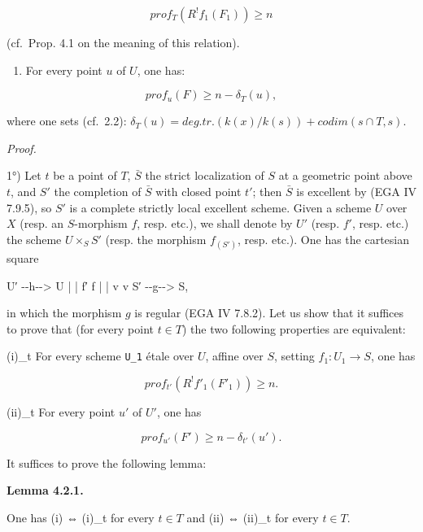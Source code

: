 \documentclass[
]{article}
\newenvironment{Shaded}{}{}
\newcommand{\NormalTok}[1]{#1}
\providecommand{\tightlist}{%
  \setlength{\itemsep}{0pt}\setlength{\parskip}{0pt}}
\begin{document}
\[
prof_{T}(R^{!} f_{1}(F_{1})) \geqslant n
\]

(cf.~Prop. 4.1 on the meaning of this relation).

\begin{enumerate}
\def\labelenumi{(\roman{enumi})}
\setcounter{enumi}{1}
\tightlist
\item
  For every point \(u\) of \(U\), one has:
\end{enumerate}

\[
prof_{u}(F) \geqslant n - \delta_{T}(u),
\]

where one sets (cf.~2.2):
\(\delta_{T}(u) = deg.tr.(k(x)/k(s)) + codim({s} \cap T, {s})\).

\emph{Proof.}

1°) Let \(t\) be a point of \(T\), \(\bar{S}\) the strict localization
of \(S\) at a geometric point above \(t\), and \(S'\) the completion of
\(\bar{S}\) with closed point \(t'\); then \(\bar{S}\) is excellent by
(EGA IV 7.9.5), so \(S'\) is a complete strictly local excellent scheme.
Given a scheme \(U\) over \(X\) (resp. an \(S\)-morphism \(f\), resp.
etc.), we shall denote by \(U'\) (resp. \(f'\), resp. etc.) the scheme
\(U \times_{S} S'\) (resp. the morphism \(f_{(S')}\), resp. etc.). One
has the cartesian square

\begin{Shaded}
\begin{Highlighting}[]
\NormalTok{U′ {-}{-}h{-}{-}\textgreater{} U}
\NormalTok{|         |}
\NormalTok{f′        f}
\NormalTok{|         |}
\NormalTok{v         v}
\NormalTok{S′ {-}{-}g{-}{-}\textgreater{} S,}
\end{Highlighting}
\end{Shaded}

in which the morphism \(g\) is regular (EGA IV 7.8.2). Let us show that
it suffices to prove that (for every point \(t \in T\)) the two
following properties are equivalent:

(i)\_t For every scheme \texttt{U\_1} étale over \(U\), affine over
\(S\), setting \(f_{1} : U_{1} \to S\), one has

\[
prof_{t'}(R^{!} f'_{1}(F'_{1})) \geqslant n.
\]

(ii)\_t For every point \(u'\) of \(U'\), one has

\[
prof_{u'}(F') \geqslant n - \delta_{t'}(u').
\]

It suffices to prove the following lemma:

\textbf{Lemma 4.2.1.}

One has (i) ⇔ (i)\_t for every \(t \in T\) and (ii) ⇔ (ii)\_t for every
\(t \in T\).
\end{document}
